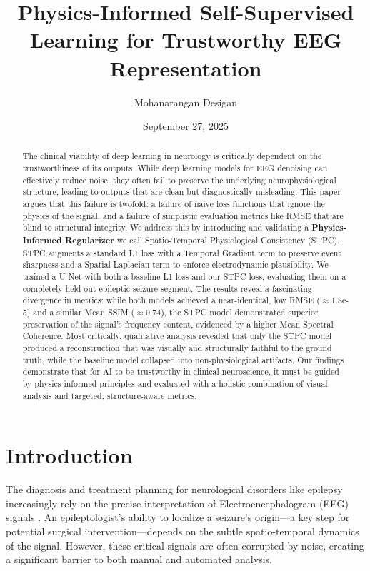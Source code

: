 \documentclass[11pt, a4paper]{article}
\title{Physics-Informed Self-Supervised Learning for Trustworthy EEG Representation}
\author{Mohanarangan Desigan}
\date{September 27, 2025}
\begin{document}

\maketitle

\begin{abstract}
\noindent The clinical viability of deep learning in neurology is critically dependent on the trustworthiness of its outputs. While deep learning models for EEG denoising can effectively reduce noise, they often fail to preserve the underlying neurophysiological structure, leading to outputs that are clean but diagnostically misleading. This paper argues that this failure is twofold: a failure of naive loss functions that ignore the physics of the signal, and a failure of simplistic evaluation metrics like RMSE that are blind to structural integrity. We address this by introducing and validating a \textbf{Physics-Informed Regularizer} we call Spatio-Temporal Physiological Consistency (STPC). STPC augments a standard L1 loss with a Temporal Gradient term to preserve event sharpness and a Spatial Laplacian term to enforce electrodynamic plausibility. We trained a U-Net with both a baseline L1 loss and our STPC loss, evaluating them on a completely held-out epileptic seizure segment. The results reveal a fascinating divergence in metrics: while both models achieved a near-identical, low RMSE ($\approx$1.8e-5) and a similar Mean SSIM ($\approx$0.74), the STPC model demonstrated superior preservation of the signal's frequency content, evidenced by a higher Mean Spectral Coherence. Most critically, qualitative analysis revealed that only the STPC model produced a reconstruction that was visually and structurally faithful to the ground truth, while the baseline model collapsed into non-physiological artifacts. Our findings demonstrate that for AI to be trustworthy in clinical neuroscience, it must be guided by physics-informed principles and evaluated with a holistic combination of visual analysis and targeted, structure-aware metrics.
\end{abstract}

\section{Introduction}
The diagnosis and treatment planning for neurological disorders like epilepsy increasingly rely on the precise interpretation of Electroencephalogram (EEG) signals \cite{goldberger2000physiobank}. An epileptologist's ability to localize a seizure's origin—a key step for potential surgical intervention—depends on the subtle spatio-temporal dynamics of the signal. However, these critical signals are often corrupted by noise, creating a significant barrier to both manual and automated analysis.
\end{document}
